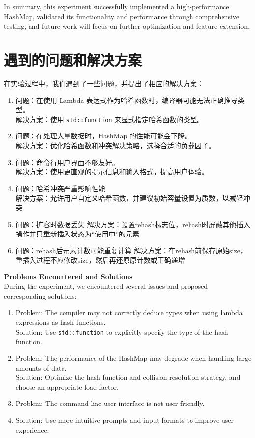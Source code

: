 \documentclass{article}
\begin{document}
    In summary, this experiment successfully implemented a high-performance HashMap, validated its functionality and performance through comprehensive testing, and future work will focus on further optimization and feature extension.

\section{遇到的问题和解决方案}
    在实验过程中，我们遇到了一些问题，并提出了相应的解决方案：
    \begin{enumerate}
        \item 问题：在使用 Lambda 表达式作为哈希函数时，编译器可能无法正确推导类型。\\
        解决方案：使用 \texttt{std::function} 来显式指定哈希函数的类型。
        \item 问题：在处理大量数据时，HashMap 的性能可能会下降。\\
        解决方案：优化哈希函数和冲突解决策略，选择合适的负载因子。
        \item 问题：命令行用户界面不够友好。\\
        解决方案：使用更直观的提示信息和输入格式，提高用户体验。
        \item 问题：哈希冲突严重影响性能\\
        解决方案：允许用户自定义哈希函数，并建议初始容量设置为质数，以减轻冲突
        \item 问题：扩容时数据丢失
        解决方案：设置rehash标志位，rehash时屏蔽其他插入操作并只重新插入状态为“使用中”的元素
        \item 问题：rehash后元素计数可能重复计算
        解决方案：在rehash前保存原始size，重插入过程不应修改size，然后再还原原计数或正确递增
    \end{enumerate}
    \bigskip

    \textbf{Problems Encountered and Solutions}\\
    During the experiment, we encountered several issues and proposed corresponding solutions:
    \begin{enumerate}
        \item Problem: The compiler may not correctly deduce types when using lambda expressions as hash functions.\\
        Solution: Use \texttt{std::function} to explicitly specify the type of the hash function.
        \item Problem: The performance of the HashMap may degrade when handling large amounts of data.\\
        Solution: Optimize the hash function and collision resolution strategy, and choose an appropriate load factor.
        \item Problem: The command-line user interface is not user-friendly.\\
        \item Solution: Use more intuitive prompts and input formats to improve user experience.
    \end{enumerate}
\end{document}

